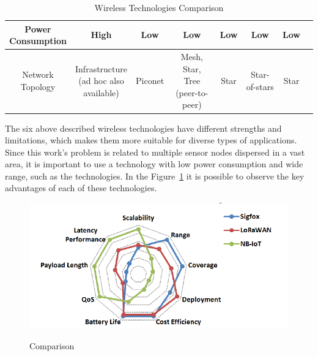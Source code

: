 \begin{table}[H]
\begin{tabular}{|c||c|c|c|c|c|c|c|}
            \makecell[ct]{Power                                                                                                     \\Consumption} & High                 & Low           & Low  &      Low           &    Low                  &     Low   \\
            \hline
            \makecell[ct]{Network                                                                                                   \\Topology}  & \makecell[ct]{Infrastructure\\(ad hoc also\\ available)}         & Piconet       & \makecell[ct]{Mesh,\\Star,\\Tree (peer-to-peer)}  &   Star   & Star-of-stars                  &   Star     \\
            \hline
      \end{tabular}
      \caption{Wireless Technologies Comparison \cite{Abdallah2020, Carvalho2017, Khan2016, Khorov2018, Oughton2021, Ramya2011, Zhang2018}}
      \label{table:1}
\end{table}

The six above described wireless technologies have different strengths and limitations, which
makes them more suitable for diverse types of applications. Since this work's problem is related
to multiple sensor nodes dispersed in a vast area, it is important to use a technology with
low power consumption and wide range, such as the  technologies. In the
Figure~\ref{fig:LPWAN_comparison} it is possible to observe the key advantages of each of these
technologies.

\begin{figure}[H]
      \caption{ Comparison \cite{Mekki2018}}
      \centering
      \includegraphics[scale=0.7]{Chapters/Figures/sigfox_nb-iot_lorawan_comparison.png}
      \label{fig:LPWAN_comparison}
\end{figure}


